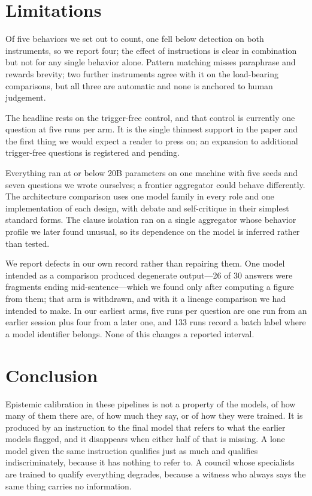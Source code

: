 \documentclass[11pt]{article}
\begin{document}
\section{Limitations}
Of five behaviors we set out to count, one fell below detection on both
instruments, so we report four; the effect of instructions is clear in
combination but not for any single behavior alone. Pattern matching misses
paraphrase and rewards brevity; two further instruments agree with it on the
load-bearing comparisons, but all three are automatic and none is anchored to
human judgement.

The headline rests on the trigger-free control, and that control is currently
one question at five runs per arm. It is the single thinnest support in the
paper and the first thing we would expect a reader to press on; an expansion
to additional trigger-free questions is registered and pending.

Everything ran at or below 20B parameters on one machine with five seeds and
seven questions we wrote ourselves; a frontier aggregator could behave
differently. The architecture comparison uses one model family in every role
and one implementation of each design, with debate and self-critique in their
simplest standard forms. The clause isolation ran on a single aggregator whose
behavior profile we later found unusual, so its dependence on the model is
inferred rather than tested.

We report defects in our own record rather than repairing them. One model
intended as a comparison produced degenerate output---26 of 30 answers were
fragments ending mid-sentence---which we found only after computing a figure
from them; that arm is withdrawn, and with it a lineage comparison we had
intended to make. In our earliest arms, five runs per question are one run
from an earlier session plus four from a later one, and 133 runs record a
batch label where a model identifier belongs. None of this changes a reported
interval.

\section{Conclusion}
Epistemic calibration in these pipelines is not a property of the models,
of how many of them there are, of how much they say, or of how they were
trained. It is produced by an instruction to the final model that refers to
what the earlier models flagged, and it disappears when either half of that is
missing. A lone model given the same instruction qualifies just as much and
qualifies indiscriminately, because it has nothing to refer to. A council
whose specialists are trained to qualify everything degrades, because a
witness who always says the same thing carries no information.
\end{document}
